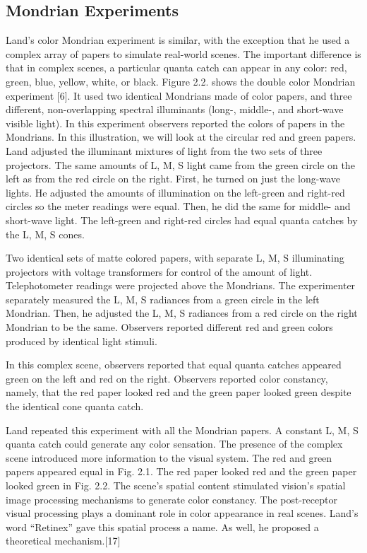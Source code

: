 \subsection{Mondrian Experiments}
Land’s color Mondrian experiment is similar, with the exception that he used a complex array of papers to simulate real-world scenes. The important difference is that in complex scenes, a particular quanta catch can appear in any color: red, green, blue, yellow, white, or black.
Figure 2.2. shows the double color Mondrian experiment [6]. It used two identical Mondrians made of color papers, and three different, non-overlapping spectral illuminants (long-, middle-, and short-wave visible light). In this experiment observers reported the colors of papers in the Mondrians. In this illustration, we will look at the circular red and green papers. Land adjusted the illuminant mixtures of light from the two sets of three projectors. The same amounts of L, M, S light came from the green circle on the left as from the red circle on the right. First, he turned on just the long-wave lights. He adjusted the amounts of illumination on the left-green and right-red circles so the meter readings were equal. Then, he did the same for middle- and short-wave light. The left-green and right-red circles had equal quanta catches by the L, M, S cones.



Two identical sets of matte colored papers, with separate L, M, S illuminating projectors with voltage transformers for control of the amount of light. Telephotometer readings were projected above the Mondrians. The experimenter separately measured the L, M, S radiances from a green circle in the left Mondrian. Then, he adjusted the L, M, S radiances from a red circle on the right Mondrian to be the same. Observers reported different red and green colors produced by identical light stimuli.

In this complex scene, observers reported that equal quanta catches appeared green on the left and red on the right. Observers reported color constancy, namely, that the red paper looked red and the green paper looked green despite the identical cone quanta catch.

Land repeated this experiment with all the Mondrian papers. A constant L, M, S quanta catch could generate any color sensation. The presence of the complex scene introduced more information to the visual system. The red and green papers appeared equal in Fig. 2.1. The red paper looked red and the green paper looked green in Fig. 2.2. The scene’s spatial content stimulated vision’s spatial image processing mechanisms to generate color constancy. The post-receptor visual processing plays a dominant role in color appearance in real scenes. Land’s word “Retinex” gave this spatial process a name. As well, he proposed a theoretical mechanism.[17]

